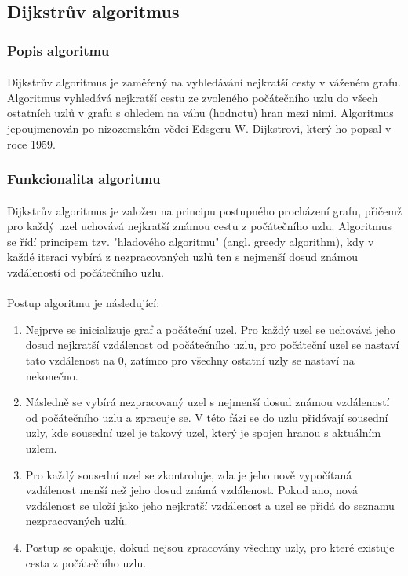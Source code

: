 \documentclass[12pt, titlepage, a4paper]{article}
\begin{document}
\subsection{Dijkstrův algoritmus}
\subsubsection{Popis algoritmu}
\paragraph{}
Dijkstrův algoritmus je zaměřený na vyhledávání nejkratší cesty v váženém grafu. Algoritmus
vyhledává nejkratší cestu ze zvoleného počátečního uzlu do všech ostatních uzlů v grafu s
ohledem na váhu (hodnotu) hran mezi nimi. Algoritmus jepoujmenován po nizozemském vědci
Edsgeru W. Dijkstrovi, který ho popsal v roce 1959.

\subsubsection{Funkcionalita algoritmu}
\paragraph{}
Dijkstrův algoritmus je založen na principu postupného procházení grafu, přičemž pro každý
uzel uchovává nejkratší známou cestu z počátečního uzlu. Algoritmus se řídí principem tzv.
"hladového algoritmu" (angl. greedy algorithm), kdy v každé iteraci vybírá z nezpracovaných
uzlů ten s nejmenší dosud známou vzdáleností od počátečního uzlu.
\paragraph{}
Postup algoritmu je následující:
\begin{enumerate}
    \item Nejprve se inicializuje graf a počáteční uzel. Pro každý uzel se uchovává jeho
          dosud nejkratší vzdálenost od počátečního uzlu, pro počáteční uzel se nastaví tato
          vzdálenost na 0, zatímco pro všechny ostatní uzly se nastaví na nekonečno.

    \item Následně se vybírá nezpracovaný uzel s nejmenší dosud známou vzdáleností od
          počátečního uzlu a zpracuje se. V této fázi se do uzlu přidávají sousední uzly, kde
          sousední uzel je takový uzel, který je spojen hranou s aktuálním uzlem.

    \item Pro každý sousední uzel se zkontroluje, zda je jeho nově vypočítaná vzdálenost
          menší než jeho dosud známá vzdálenost. Pokud ano, nová vzdálenost se uloží jako jeho
          nejkratší vzdálenost a uzel se přidá do seznamu nezpracovaných uzlů.

    \item Postup se opakuje, dokud nejsou zpracovány všechny uzly, pro které existuje
          cesta z počátečního uzlu.
\end{enumerate}
\end{document}
